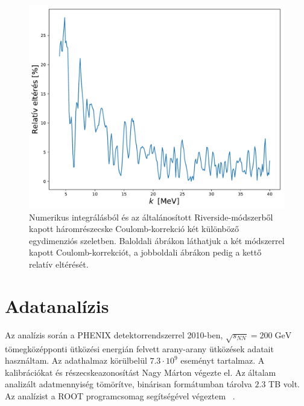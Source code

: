 \documentclass[11pt,a4paper]{article}
\numberwithin{equation}{subsection}
\numberwithin{figure}{section}
\begin{document}
\begin{figure}[H]
\includegraphics[scale=0.36]{pic/Coulomb/r3/K3-2_error.pdf}
\caption{Numerikus integrálásból és az általánosított Riverside-módszerből kapott háromrészecske Coulomb-korrekció két különböző egydimenziós szeletben. Baloldali ábrákon láthatjuk a két módszerrel kapott Coulomb-korrekciót, a jobboldali ábrákon pedig a kettő relatív eltérését.}
\label{fig:K3calc}
\end{figure}




\section{Adatanalízis}

Az analízis során a PHENIX detektorrendszerrel 2010-ben, $\sqrt{s_{NN}}=200\;\mathrm{GeV}$ tömegközépponti ütközési energián felvett arany-arany ütközések adatait használtam. Az adathalmaz körülbelül $7.3\cdot 10^9$ eseményt tartalmaz. A kalibrációkat és részecskeazonosítást Nagy Márton végezte el. Az általam analizált adatmennyiség tömörítve, binárisan formátumban tárolva $2.3$ TB volt. Az analízist a ROOT programcsomag segítségével végeztem ~\cite{root}.
\end{document}
